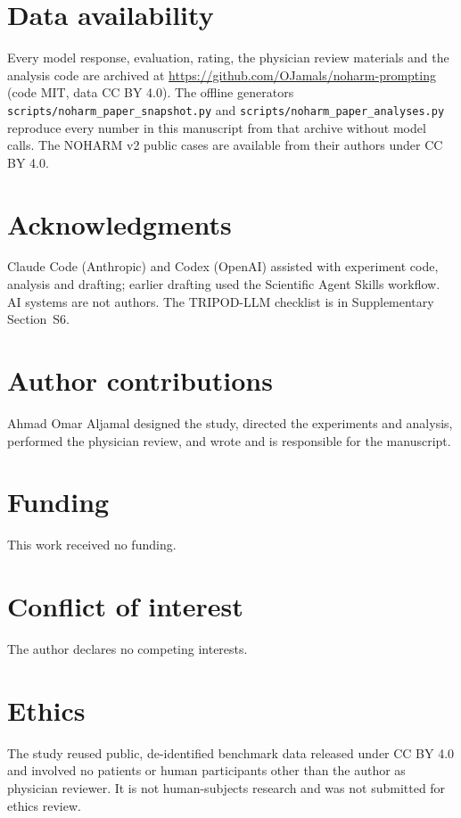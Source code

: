 \documentclass[11pt]{article}
\begin{document}
\section*{Data availability}
Every model response, evaluation, rating, the physician review materials and the analysis code are
archived at \url{https://github.com/OJamals/noharm-prompting} (code MIT, data CC BY 4.0). The
offline generators \nolinkurl{scripts/noharm_paper_snapshot.py} and
\nolinkurl{scripts/noharm_paper_analyses.py} reproduce every number in this manuscript from that
archive without model calls. The NOHARM v2 public cases are available from their authors under CC BY
4.0.

\section*{Acknowledgments}
Claude Code (Anthropic) and Codex (OpenAI) assisted with experiment code, analysis and drafting;
earlier drafting used the Scientific Agent Skills workflow.\citep{kassis2026skills} AI systems are
not authors. The TRIPOD-LLM checklist\citep{gallifant2025tripodllm} is in Supplementary
Section~S6.

\section*{Author contributions}
Ahmad Omar Aljamal designed the study, directed the experiments and analysis, performed the
physician review, and wrote and is responsible for the manuscript.

\section*{Funding}
This work received no funding.

\section*{Conflict of interest}
The author declares no competing interests.

\section*{Ethics}
The study reused public, de-identified benchmark data released under CC BY 4.0 and involved no
patients or human participants other than the author as physician reviewer. It is not
human-subjects research and was not submitted for ethics review.

\begingroup
\small
\setlength{\bibsep}{0.3\baselineskip}


\endgroup
\end{document}

